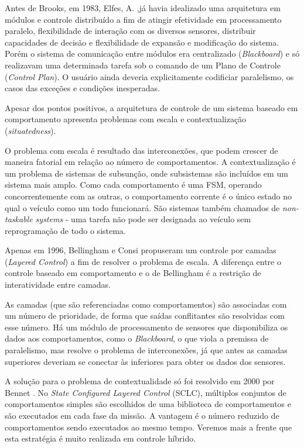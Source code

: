 Antes de Brooks, em 1983, Elfes, A. \cite{elfes1983distributed},já havia
idealizado uma arquitetura em módulos e controle distribuído a fim de atingir efetividade em processamento
paralelo, flexibilidade de interação com os diversos sensores, distribuir
capacidades de decisão e flexibilidade de expansão e modificação do sistema.
Porém o sistema de comunicação entre módulos era centralizado
(\emph{Blackboard}) e só realizavam uma determinada tarefa sob o comando de um
Plano de Controle (\emph{Control Plan}). O usuário ainda deveria explicitamente
codificiar paralelismo, os casos das exceções e condições inesperadas.

Apesar dos pontos positivos, a arquitetura de controle de um sistema
baseado em comportamento apresenta problemas com escala e contextualização
(\emph{situatedness}). 

O problema com escala é resultado das interconexões, que
podem crescer de maneira fatorial em relação ao número de comportamentos. 
A contextualização é um problema de sistemas de subsunção, onde subsistemas são
incluídos em um sistema mais amplo. Como cada comportamento é uma FSM, operando
concorrentemente com as outras, o comportamento corrente é o único estado no
qual o veículo como um todo funcionará. São sistemas também chamados de
\emph{non-taskable systems} - uma tarefa não pode ser designada ao
veículo sem reprogramação de todo o sistema.  

Apenas em 1996, Bellingham e Consi \cite{bellingham1994second}
propuseram um controle por camadas (\emph{Layered Control}) a fim de resolver o
problema de escala. A diferença entre o controle baseado em comportamento e o de
Bellingham é a restrição de interatividade entre camadas.

As camadas (que são referenciadas como comportamentos) são associadas com um número de
prioridade, de forma que saídas conflitantes são resolvidas com esse número. Há
um módulo de processamento de sensores que disponibiliza os dados aos
comportamentos, como o \emph{Blackboard}, o que viola a premissa de
paralelismo, mas resolve o problema de interconexões, já que antes as camadas
superiores deveriam se conectar às inferiores para obter os dados dos sensores.

A solução para o problema de contextualidade só foi resolvido em 2000 por Bennet
\cite{bennett2000behavior}. No \emph{State Configured Layered Control} (SCLC),
múltiplos conjuntos de comportamentos simples são escolhidos de uma biblioteca
de comportamentos e são executados em cada fase da missão. A vantagem é o
número reduzido de comportamentos sendo executados ao mesmo tempo. Veremos mais
a frente que esta estratégia é muito realizada em controle híbrido.

